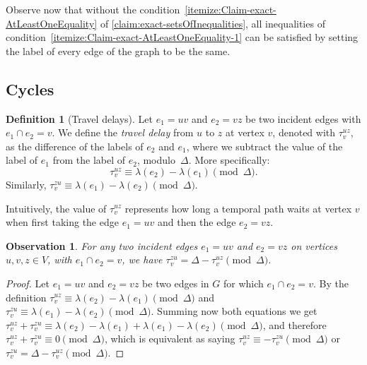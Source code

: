 \documentclass[11pt,a4paper]{article}
\newtheorem{observation}{Observation}
\theoremstyle{remark}
\theoremstyle{definition}
\newtheorem{definition}[theorem]{Definition}
\begin{document}
    Observe now that without the condition~\ref{itemize:Claim-exact-AtLeastOneEquality} of \cref{claim:exact-setsOfInequalities}, all inequalities of condition~\ref{itemize:Claim-exact-AtLeastOneEquality-1} can be satisfied by setting the label of every edge of the graph to be the same.
    
    \subsection*{Cycles}
    \begin{definition}[Travel delays]
    Let $e_1=uv$ and $e_2=vz$ be two incident edges with $e_1 \cap e_2 = v$.
    We define the \emph{travel delay} from $u$ to $z$ at vertex $v$, denoted with $\tau_v^{uz}$,
    as the difference of the labels of $e_2$ and $e_1$, where we subtract the value of the label of $e_1$ from the label of $e_2$,  modulo~$\Delta$.
    More specifically:
    \begin{equation}\label{eq:def-VertexWaitingTime}
       \tau_v^{uz} \equiv \lambda (e_2) - \lambda(e_1) \pmod \Delta.
    \end{equation}
    Similarly, $\tau_v^{zu} \equiv \lambda (e_1) - \lambda(e_2) \pmod \Delta$.
    \end{definition}
    Intuitively, the value of $\tau_v^{uz}$ represents how long a temporal path waits at vertex $v$ when first taking the edge $e_1=uv$ and then the edge $e_2 = vz$.
    
    \begin{observation}
    For any two incident edges $e_1 = uv$ and $e_2 = vz$ on vertices $u,v,z \in V$, with $e_1 \cap e_2 = v$, we have $\tau_v^{zu} = \Delta - \tau_v^{uz} \pmod \Delta$.
    \end{observation}
    
    \begin{proof}
        Let $e_1 = uv$ and $e_2 = vz$ be two edges in $G$ for which $e_1 \cap e_2 = v$. 
        By the definition $\tau_v^{uz} \equiv \lambda (e_2) - \lambda(e_1) \pmod \Delta$ and $\tau_v^{zu} \equiv \lambda (e_1) - \lambda(e_2) \pmod \Delta$.
        Summing now both equations we get $\tau_v^{uz} + \tau_v^{zu} \equiv \lambda(e_2) - \lambda(e_1) + \lambda (e_1) - \lambda(e_2) \pmod \Delta$, and therefore $\tau_v^{uz} + \tau_v^{zu} \equiv 0 \pmod \Delta$, which is equivalent as saying $\tau_v^{uz} \equiv - \tau_v^{zu} \pmod \Delta$ or $\tau_v^{zu} = \Delta - \tau_v^{uz} \pmod \Delta$.
    \end{proof}
\end{document}
